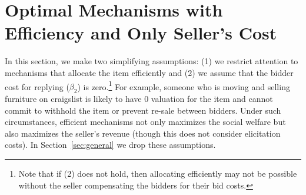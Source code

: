 \section{Optimal Mechanisms with Efficiency and Only Seller's Cost}
\label{sec:efficient}

In this section, we make two simplifying assumptions: (1) we restrict
attention to mechanisms that allocate the item efficiently and (2) we
assume that the bidder cost for replying ($\beta_2$) is zero.\footnote{Note
that if (2) does not hold, then allocating efficiently may not be possible
without the seller compensating the bidders for their bid costs.}
For example, someone who is moving and selling furniture on craigslist is
likely to have $0$ valuation for the item 
and cannot commit to withhold the item or prevent re-sale between
bidders. Under such circumstances,  efficient mechanisms not only maximizes the
social welfare but also maximizes the seller's revenue
\cite{Ausubel99:EfficientOptimality} (though this does not consider
elicitation costs).
In Section~\ref{sec:general} we drop these assumptions.


%
%
%

